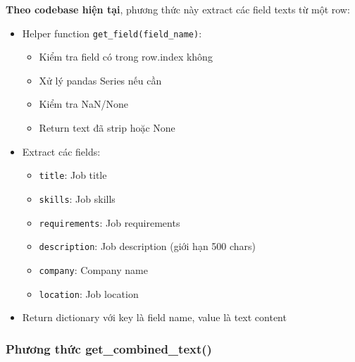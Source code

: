 \textbf{Theo codebase hiện tại}, phương thức này extract các field texts từ một row:
\begin{itemize}
    \item Helper function \texttt{get\_field(field\_name)}:
    \begin{itemize}
        \item Kiểm tra field có trong row.index không
        \item Xử lý pandas Series nếu cần
        \item Kiểm tra NaN/None
        \item Return text đã strip hoặc None
    \end{itemize}
    \item Extract các fields:
    \begin{itemize}
        \item \texttt{title}: Job title
        \item \texttt{skills}: Job skills
        \item \texttt{requirements}: Job requirements
        \item \texttt{description}: Job description (giới hạn 500 chars)
        \item \texttt{company}: Company name
        \item \texttt{location}: Job location
    \end{itemize}
    \item Return dictionary với key là field name, value là text content
\end{itemize}

\subsubsection{Phương thức get\_combined\_text()}

